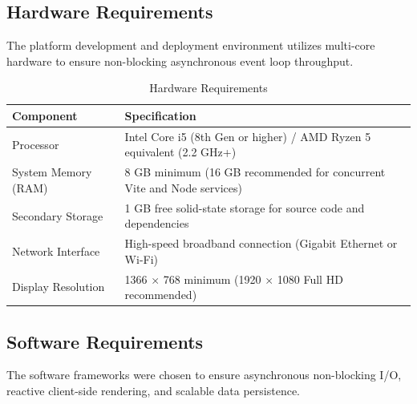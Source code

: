 \documentclass[12pt,a4paper]{report}
\begin{document}
\subsection{Hardware Requirements}
The platform development and deployment environment utilizes multi-core hardware to ensure non-blocking asynchronous event loop throughput.

\begin{table}[H]
\centering
\caption{Hardware Requirements}
\begin{tabularx}{\textwidth}{lX}
\toprule
\textbf{Component} & \textbf{Specification} \\
\midrule
Processor & Intel Core i5 (8th Gen or higher) / AMD Ryzen 5 equivalent (2.2 GHz+) \\
System Memory (RAM) & 8 GB minimum (16 GB recommended for concurrent Vite and Node services) \\
Secondary Storage & 1 GB free solid-state storage for source code and dependencies \\
Network Interface & High-speed broadband connection (Gigabit Ethernet or Wi-Fi) \\
Display Resolution & 1366 $\times$ 768 minimum (1920 $\times$ 1080 Full HD recommended) \\
\bottomrule
\end{tabularx}
\end{table}

\subsection{Software Requirements}
The software frameworks were chosen to ensure asynchronous non-blocking I/O, reactive client-side rendering, and scalable data persistence.
\end{document}
